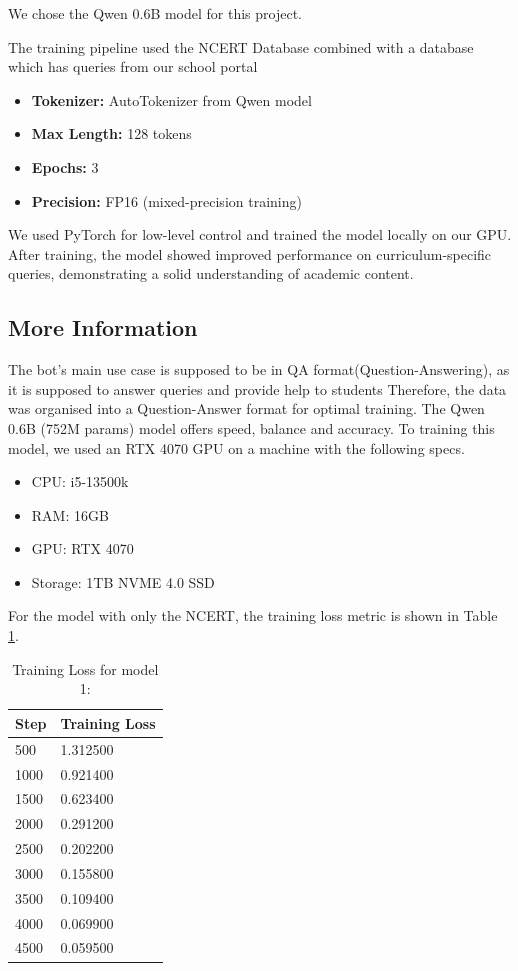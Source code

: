 \documentclass[9pt,a4paper,twocolumn,twoside]{tau-class/tau}
\begin{document}
We chose the Qwen 0.6B model for this project.

The training pipeline used the NCERT Database combined with a database which has queries from our school portal
\begin{itemize}
	\item \textbf{Tokenizer:} AutoTokenizer from Qwen model
	\item \textbf{Max Length:} 128 tokens
	\item \textbf{Epochs:} 3
	\item \textbf{Precision:} FP16 (mixed-precision training)
\end{itemize}

We used PyTorch for low-level control and trained the model locally on our GPU. After training, the model showed improved performance on curriculum-specific queries, demonstrating a solid understanding of academic content.

\subsection{More Information}

The bot's main use case is supposed to be in QA format(Question-Answering), as it is supposed to answer queries and provide help to students Therefore, the data was organised into a Question-Answer format for optimal training. The Qwen 0.6B (752M params) model offers speed, balance and accuracy. To training this model, we used an RTX 4070 GPU on a machine with the following specs.
\begin{itemize}
	\item CPU: i5-13500k
	\item RAM: 16GB
	\item GPU: RTX 4070
	\item Storage: 1TB NVME 4.0 SSD
\end{itemize} For the model with only the NCERT, the training loss metric is shown in Table \ref{tab:train_loss}.
\begin{table}[H]
	\centering
	\caption{Training Loss for model 1:}
	\label{tab:train_loss}
	\begin{tabular}{ll}
		\toprule
		\textbf{Step} & \textbf{Training Loss} \\
		\midrule
		500           & 1.312500               \\
		1000          & 0.921400               \\
		1500          & 0.623400               \\
		2000          & 0.291200               \\
		2500          & 0.202200               \\
		3000          & 0.155800               \\
		3500          & 0.109400               \\
		4000          & 0.069900               \\
		4500          & 0.059500               \\
		\bottomrule
	\end{tabular}
\end{table}
\end{document}
